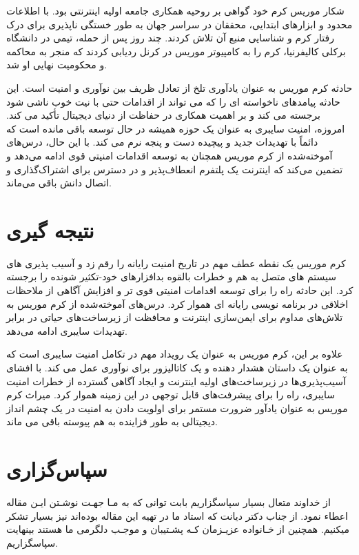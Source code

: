 \documentclass{ISCISC2020}
\begin{document}
شکار موریس کرم خود گواهی بر روحیه همکاری جامعه اولیه اینترنتی بود. با اطلاعات محدود و ابزارهای ابتدایی، محققان در سراسر جهان به طور خستگی ناپذیری برای درک رفتار کرم و شناسایی منبع آن تلاش کردند. چند روز پس از حمله، تیمی در دانشگاه برکلی کالیفرنیا، کرم را به کامپیوتر موریس در کرنل ردیابی کردند که منجر به محاکمه و محکومیت نهایی او شد.

حادثه کرم موریس به عنوان یادآوری تلخ از تعادل ظریف بین نوآوری و امنیت است. این حادثه پیامدهای ناخواسته ای را که می تواند از اقدامات حتی با نیت خوب ناشی شود برجسته می کند و بر اهمیت همکاری در حفاظت از دنیای دیجیتال تأکید می کند. امروزه، امنیت سایبری به عنوان یک حوزه همیشه در حال توسعه باقی مانده است که دائماً با تهدیدات جدید و پیچیده دست و پنجه نرم می کند. با این حال، درس‌های آموخته‌شده از کرم موریس همچنان به توسعه اقدامات امنیتی قوی ادامه می‌دهد و تضمین می‌کند که اینترنت یک پلتفرم انعطاف‌پذیر و در دسترس برای اشتراک‌گذاری و اتصال دانش باقی می‌ماند.


\section{نتیجه گیری‌}
کرم موریس یک نقطه عطف مهم در تاریخ امنیت رایانه را رقم زد و آسیب پذیری های سیستم های متصل به هم و خطرات بالقوه بدافزارهای خود-تکثیر شونده را برجسته کرد. این حادثه راه را برای توسعه اقدامات امنیتی قوی تر و افزایش آگاهی از ملاحظات اخلاقی در برنامه نویسی رایانه ای هموار کرد. درس‌های آموخته‌شده از کرم موریس به تلاش‌های مداوم برای ایمن‌سازی اینترنت و محافظت از زیرساخت‌های حیاتی در برابر تهدیدات سایبری ادامه می‌دهد.

علاوه بر این، کرم موریس به عنوان یک رویداد مهم در تکامل امنیت سایبری است که به عنوان یک داستان هشدار دهنده و یک کاتالیزور برای نوآوری عمل می کند. با افشای آسیب‌پذیری‌ها در زیرساخت‌های اولیه اینترنت و ایجاد آگاهی گسترده از خطرات امنیت سایبری، راه را برای پیشرفت‌های قابل توجهی در این زمینه هموار کرد. میراث کرم موریس به عنوان یادآور ضرورت مستمر برای اولویت دادن به امنیت در یک چشم انداز دیجیتالی به طور فزاینده به هم پیوسته باقی می ماند.


\section*{سپاس‌گزاری}
از خداوند متعال بسيار سپاسگزاریم بابت توانی كه به مـا جهـت نوشـتن ايـن
مقاله اعطاء نمود. از جناب دكتر دیانت كه استاد ما در تهيه اين مقاله بوده‌اند
نيز بسيار تشكر ميكنیم. همچنين از خـانواده عزيـزمان كـه پشـتيبان و موجـب
دلگرمی ما هستند بينهايت سپاسگزاریم. 
\end{document}
